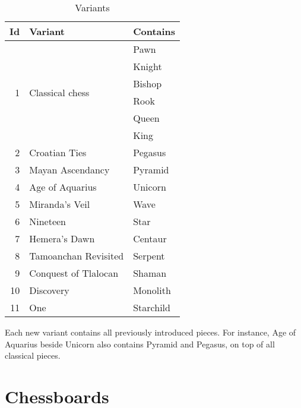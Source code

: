\begin{table}[!h]
\centering
\begin{tabular}{ rll }
\toprule
\textbf{Id} & \textbf{Variant} & \textbf{Contains}                  \\
\midrule
\multirow{6}{*}{1} & \multirow{6}{*}{Classical chess} & Pawn        \\
                   &                                  & Knight      \\
                   &                                  & Bishop      \\
                   &                                  & Rook        \\
                   &                                  & Queen       \\
                   &                                  & King        \\ \cmidrule{1-3}
                 2 & Croatian Ties                    & Pegasus     \\
                 3 & Mayan Ascendancy                 & Pyramid     \\
                 4 & Age of Aquarius                  & Unicorn     \\
                 5 & Miranda's Veil                   & Wave        \\
                 6 & Nineteen                         & Star        \\
                 7 & Hemera's Dawn                    & Centaur     \\
                 8 & Tamoanchan Revisited             & Serpent     \\
                 9 & Conquest of Tlalocan             & Shaman      \\
                10 & Discovery                        & Monolith    \\
                11 & One                              & Starchild   \\
\bottomrule
\end{tabular}
\caption{Variants}
\label{tbl:Appendix/Variants}
\end{table}

Each new variant contains all previously introduced pieces. For instance, Age of Aquarius
beside Unicorn also contains Pyramid and Pegasus, on top of all classical pieces.

\clearpage %

\section*{Chessboards}
\label{sec:Appendix/Chessboards}

